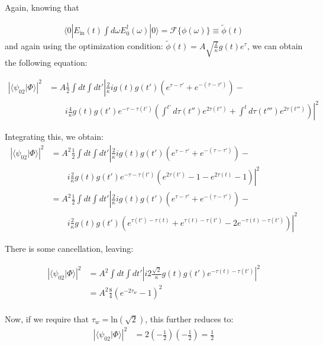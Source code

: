 \documentclass[12pt]{article}
\begin{document}
Again, knowing that


\begin{align}
\langle 0 |E_\textrm{in}(t) \int d\omega E^\dagger_0(\omega) | 0 \rangle= \mathscr{F}\{\phi(\omega)\} \equiv \tilde{\phi}(t)
\end{align}
and again using the optimization condition: $\tilde{\phi}(t) =A \sqrt{\frac{2}{\kappa}} g(t) e^{\tau}$, we can obtain the following equation:

\begin{align}
\left | \langle \psi_{02} | \Phi \rangle \right | ^2 & =A \frac{1}{2}\int dt \int dt'\left | \frac{2}{\kappa} i g(t) g(t') \left(e^{\tau-\tau'} +e^{-(\tau-\tau')}\right) -\right.\\
&\qquad \left.i \frac{4}{\kappa}g(t) g(t') e^{-\tau-\tau(t')}\left( \int^{t'} d \tau(t'') e^{2\tau(t'')} + \int^t d \tau(t''') e^{2\tau(t''')} \right) \right |^2
\end{align}

Integrating this, we obtain:
\begin{align}
\left | \langle \psi_{02} | \Phi \rangle \right | ^2 & =A^2 \frac{1}{2}\int dt \int dt'\left | \frac{2}{\kappa} i g(t) g(t') \left(e^{\tau-\tau'} +e^{-(\tau-\tau')}\right) -\right.\\
&\qquad \left.i \frac{2}{\kappa}g(t) g(t') e^{-\tau-\tau(t')}\left( e^{2\tau(t')}-1 - e^{2\tau(t)}-1 \right) \right |^2 \\
 &=A^2  \frac{1}{2}\int dt \int dt'\left | \frac{2}{\kappa} i g(t) g(t') \left(e^{\tau-\tau'} +e^{-(\tau-\tau')}\right) -\right.\\
&\qquad \left.i \frac{2}{\kappa}g(t) g(t') \left( e^{\tau(t')-\tau(t)} + e^{\tau(t)-\tau(t')}-2e^{-\tau(t)-\tau(t')} \right) \right |^2
\end{align}

There is some cancellation, leaving:

\begin{align}
\label{p02}
\left | \langle \psi_{02} | \Phi \rangle \right | ^2 & =A^2\int dt \int dt'\left |i 2\frac{\sqrt{2}}{\kappa} g(t)g(t') e^{-\tau(t)-\tau(t')} \right|^2 \\
&=A^2 \frac{8}{4} \left ( e^{-2\tau_w}-1\right)^2\\
\end{align}

Now, if we require that $\tau_w = \textrm{ln}(\sqrt{2})$, this further reduces to:
\begin{align}
\left | \langle \psi_{02} | \Phi \rangle \right | ^2 &=2(-\frac{1}{2})(-\frac{1}{2})=\frac{1}{2}
\end{align}
\end{document}
